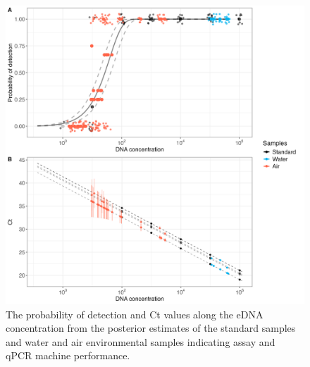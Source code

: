 \documentclass{article}
\begin{document}
\clearpage
\begin{figure}[tbhp] 
\centering
\includegraphics[width=12.0cm]{Plots/Supplementary_Fig_1.jpg}  
\caption{The probability of detection and Ct values along the eDNA concentration from the posterior estimates of the standard samples and water and air environmental samples indicating assay and qPCR machine performance.}
\label{fig:qpcr}
\end{figure}
\end{document}
